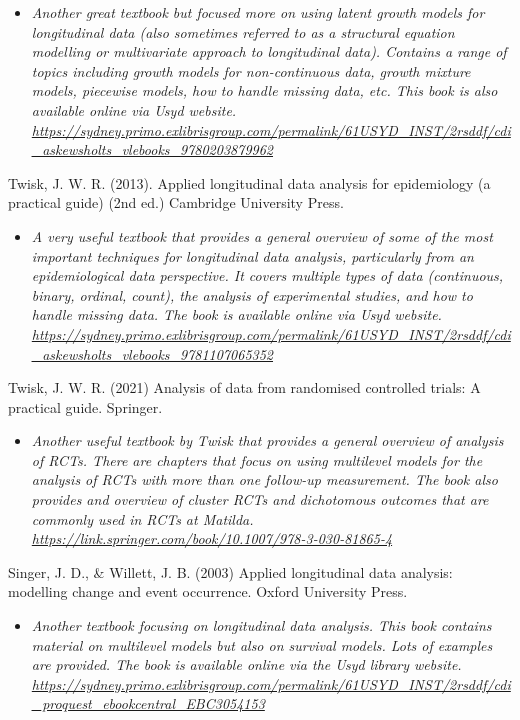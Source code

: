 \documentclass[
]{book}
\providecommand{\tightlist}{%
  \setlength{\itemsep}{0pt}\setlength{\parskip}{0pt}}
\begin{document}
\begin{itemize}
\tightlist
\item
  \emph{Another great textbook but focused more on using latent growth models for longitudinal data (also sometimes referred to as a structural equation modelling or multivariate approach to longitudinal data). Contains a range of topics including growth models for non-continuous data, growth mixture models, piecewise models, how to handle missing data, etc. This book is also available online via Usyd website. \url{https://sydney.primo.exlibrisgroup.com/permalink/61USYD_INST/2rsddf/cdi_askewsholts_vlebooks_9780203879962} }
\end{itemize}

Twisk, J. W. R. (2013). Applied longitudinal data analysis for epidemiology (a practical guide) (2nd ed.) Cambridge University Press.

\begin{itemize}
\tightlist
\item
  \emph{A very useful textbook that provides a general overview of some of the most important techniques for longitudinal data analysis, particularly from an epidemiological data perspective. It covers multiple types of data (continuous, binary, ordinal, count), the analysis of experimental studies, and how to handle missing data. The book is available online via Usyd website. \url{https://sydney.primo.exlibrisgroup.com/permalink/61USYD_INST/2rsddf/cdi_askewsholts_vlebooks_9781107065352} }
\end{itemize}

Twisk, J. W. R. (2021) Analysis of data from randomised controlled trials: A practical guide. Springer.

\begin{itemize}
\tightlist
\item
  \emph{Another useful textbook by Twisk that provides a general overview of analysis of RCTs. There are chapters that focus on using multilevel models for the analysis of RCTs with more than one follow-up measurement. The book also provides and overview of cluster RCTs and dichotomous outcomes that are commonly used in RCTs at Matilda. \url{https://link.springer.com/book/10.1007/978-3-030-81865-4} }
\end{itemize}

Singer, J. D., \& Willett, J. B. (2003) Applied longitudinal data analysis: modelling change and event occurrence. Oxford University Press.

\begin{itemize}
\tightlist
\item
  \emph{Another textbook focusing on longitudinal data analysis. This book contains material on multilevel models but also on survival models. Lots of examples are provided. The book is available online via the Usyd library website. \url{https://sydney.primo.exlibrisgroup.com/permalink/61USYD_INST/2rsddf/cdi_proquest_ebookcentral_EBC3054153}}
\end{itemize}
\end{document}
